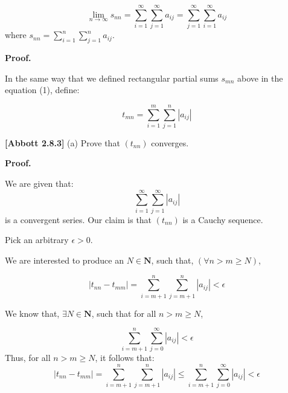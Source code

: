 \documentclass[10pt]{article}
\begin{document}
\begin{equation*}
\lim _{n\rightarrow \infty } s_{nn} =\sum _{i=1}^{\infty }\sum _{j=1}^{\infty } a_{ij} =\sum _{j=1}^{\infty }\sum _{i=1}^{\infty } a_{ij}
\end{equation*}
where $\displaystyle s_{nn} =\sum _{i=1}^{n}\sum _{j=1}^{n} a_{ij}$.



\textbf{Proof.}



In the same way that we defined rectangular partial sums $\displaystyle s_{mn}$ above in the equation (1), define:


\begin{equation*}
t_{mn} =\sum _{i=1}^{m}\sum _{j=1}^{n} |a_{ij} |
\end{equation*}


\textbf{[Abbott 2.8.3]} (a) Prove that $\displaystyle ( t_{nn})$ converges.



\textbf{Proof.}



We are given that:
\begin{equation*}
\sum _{i=1}^{\infty }\sum _{j=1}^{\infty } |a_{ij} |
\end{equation*}
is a convergent series. Our claim is that $\displaystyle ( t_{nn})$ is a Cauchy sequence. 



Pick an arbitrary $\displaystyle \epsilon  >0$. 



We are interested to produce an $\displaystyle N\in \mathbf{N}$, such that, $\displaystyle ( \forall n >m\geq N)$,


\begin{equation*}
|t_{nn} -t_{mm} |=\sum _{i=m+1}^{n}\sum _{j=m+1}^{n} |a_{ij} |< \epsilon 
\end{equation*}


We know that, $\displaystyle \exists N\in \mathbf{N}$, such that for all $\displaystyle n >m\geq N$, 


\begin{equation*}
\sum _{i=m+1}^{n}\sum _{j=0}^{\infty } |a_{ij} |< \epsilon 
\end{equation*}
Thus, for all $\displaystyle n >m\geq N$, it follows that:
\begin{equation*}
|t_{nn} -t_{mm} |=\sum _{i=m+1}^{n}\sum _{j=m+1}^{n} |a_{ij} |\leq \sum _{i=m+1}^{n}\sum _{j=0}^{\infty } |a_{ij} |< \epsilon 
\end{equation*}
\end{document}
